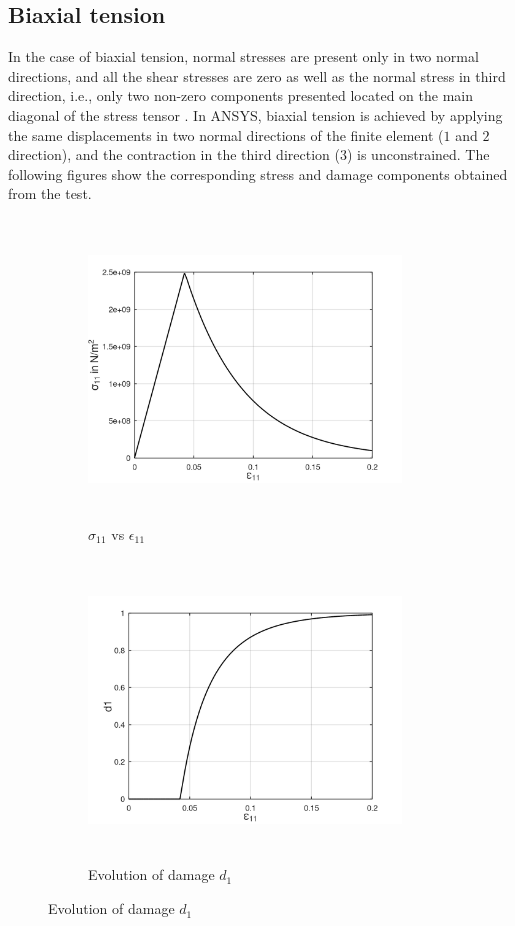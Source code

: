 \documentclass[12pt]{report}
\begin{document}
\subsection{Biaxial tension}
\indent\indent\indent  In the case of biaxial tension, normal stresses are present only in two normal directions, and all the shear stresses are zero as well as the normal stress in third direction, i.e., only two non-zero components presented located on the main diagonal of the stress tensor . In ANSYS, biaxial tension is achieved by applying the same displacements in two normal directions of the finite element ($1$ and $2$ direction), and the contraction in the third direction ($3$) is unconstrained. The following figures show the corresponding stress and damage components obtained from the test.
\begin{figure}[hbt!]
     \captionsetup[subfigure]{justification=centering}
     \begin{subfigure}{0.4\textwidth}
         \includegraphics[width=8.3cm,height=8cm,keepaspectratio]{23.S11vsE11.png}
         \caption{$\sigma_{11}$ vs $\epsilon_{11}$}
         \label{fig:S11vsE11}
     \end{subfigure}
	\hspace{1.8cm}
     \captionsetup[subfigure]{justification=centering}
     \begin{subfigure}{0.4\textwidth}
         \includegraphics[width=8.3cm,height=8cm,keepaspectratio]{23.d1.png}
         \caption{Evolution of damage $d_{1}$}
         \label{fig:Evolution of damage d1}
     \end{subfigure}
\end{figure}
\end{document}
